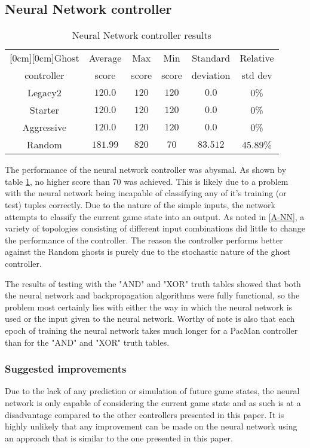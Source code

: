 \subsection{Neural Network controller}
\begin{table}[h]
\caption{Neural Network controller results}
\begin{center}
\begin{tabular}{|c|c|c|c|c|c|}
\hline
\multicolumn{1}{|c|}{\raisebox{-0.50ex}[0cm][0cm]{\!Ghost\!}}
& \multicolumn{1}{|c|}{Average}
& \multicolumn{1}{|c|}{Max}
& \multicolumn{1}{|c|}{Min} 
& \multicolumn{1}{|c|}{Standard}
& \multicolumn{1}{|c|}{Relative}\\
controller & score & score & score & deviation & std dev\\ \hline
Legacy2 &  $120.0$  &  $120$  &  $120$ & $0.0$ & 0\%\\ \hline
Starter &  $120.0$  &  $120$  &  $120$ & $0.0$ & 0\%\\ \hline
Aggressive &  $120.0$  &  $120$  &  $120$ & $0.0$ & 0\%\\ \hline
Random &  $181.99$  &  $820$  &  $70$ & $83.512$ & 45.89\%\\ \hline
\end{tabular}
\label{table-nnResults}
\end{center}
\end{table}

The performance of the neural network controller was abysmal. As shown by table \ref{table-nnResults}, no higher score than 70 was achieved. This is likely due to a problem with the neural network being incapable of classifying any of it's training (or test) tuples correctly. Due to the nature of the simple inputs, the network attempts to classify the current game state into an output. As noted in \ref{A-NN}, a variety of topologies consisting of different input combinations did little to change the performance of the controller. The reason the controller performs better against the Random ghosts is purely due to the stochastic nature of the ghost controller.

The results of testing with the "AND" and "XOR" truth tables showed that both the neural network and backpropagation algorithms were fully functional, so the problem most certainly lies with either the way in which the neural network is used or the input given to the neural network. Worthy of note is also that each epoch of training the neural network takes much longer for a PacMan controller than for the "AND" and "XOR" truth tables.
\subsubsection{Suggested improvements}
Due to the lack of any prediction or simulation of future game states, the neural network is only capable of considering the current game state and as such is at a disadvantage compared to the other controllers presented in this paper. It is highly unlikely that any improvement can be made on the neural network using an approach that is similar to the one presented in this paper. 

